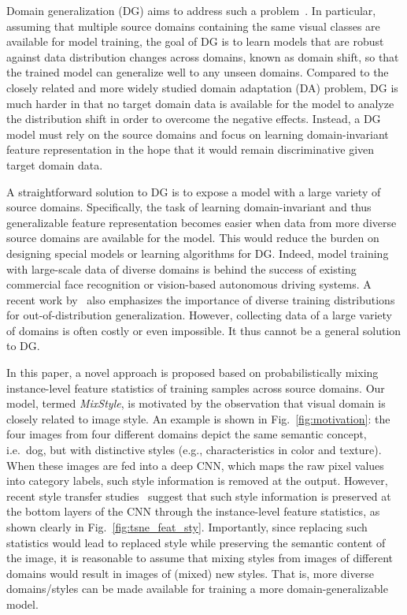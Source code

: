 \documentclass{article} \usepackage{iclr2021_conference,times}
\begin{document}
Domain generalization (DG) aims to address such a problem~\citep{zhou2021domain,blanchard2011generalizing,muandet2013domain,li2018learning,zhou2020deep,balaji2018metareg,dou2019domain,cvpr19jigen}. In particular, assuming that multiple source domains containing the same visual classes are available for model training, the goal of DG is to learn models that are robust against data distribution changes across domains, known as domain shift, so that the trained model can generalize well to any unseen domains. Compared to the closely related and more widely studied domain adaptation (DA) problem, DG is much harder in that no target domain data is available for the model to analyze the distribution shift in order to overcome the negative effects. Instead, a DG model must rely on the source domains and focus on learning domain-invariant feature representation in the hope that it would remain discriminative given target domain data.

A straightforward solution to DG is to expose a model with a large variety of source domains. Specifically, the task of learning domain-invariant and thus generalizable feature representation becomes easier when data from more diverse source domains are available for the model. This would reduce the burden on designing special models or learning algorithms for DG. Indeed, model training with large-scale data of diverse domains is behind the success of existing commercial face recognition or vision-based autonomous driving systems. A recent work by~\citet{xu2021how} also emphasizes the importance of diverse training distributions for out-of-distribution generalization. However, collecting data of a large variety of domains is often costly or even impossible. It thus cannot be a general solution to DG.

In this paper, a novel approach is proposed based on probabilistically mixing instance-level feature statistics of training samples across source domains. Our model, termed \emph{MixStyle}, is motivated by the observation that visual domain is closely related to image style. An example is shown in Fig.~\ref{fig:motivation}: the four images from four different domains depict the same semantic concept, i.e.~dog, but with distinctive styles (e.g., characteristics in color and texture). When these images are fed into a deep CNN, which maps the raw pixel values into category labels, such style information is removed at the output. However, recent style transfer studies~\citep{huang2017arbitrary,dumoulin2017learned} suggest that such style information is preserved at the bottom layers of the CNN through the instance-level feature statistics, as shown clearly in Fig.~\ref{fig:tsne_feat_sty}. Importantly, since replacing such statistics would lead to replaced style while preserving the semantic content of the image, it is reasonable to assume that mixing styles from images of different domains would result in images of (mixed) new styles. That is, more diverse domains/styles can be made available for training a more domain-generalizable model. 
\end{document}
